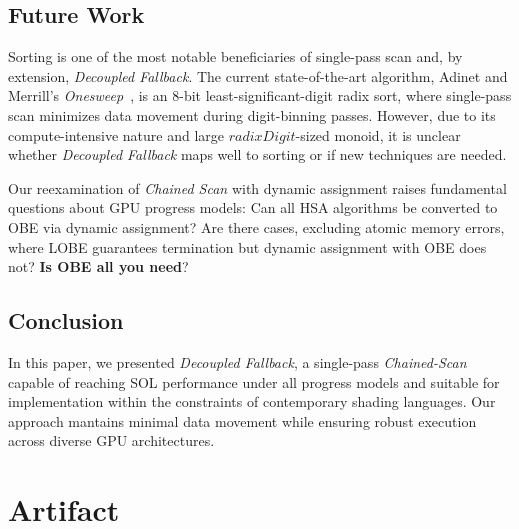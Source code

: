 \documentclass[sigconf]{acmart}
\begin{document}
\subsection{Future Work}
Sorting is one of the most notable beneficiaries of single-pass scan and, by extension, \emph{Decoupled Fallback}. The current state-of-the-art algorithm, Adinet and Merrill’s \emph{Onesweep}~\cite{adinets2022onesweepfastersignificantdigit}, is an 8-bit least-significant-digit radix sort, where single-pass scan minimizes data movement during digit-binning passes. However, due to its compute-intensive nature and large $radixDigit$-sized monoid, it is unclear whether \emph{Decoupled Fallback} maps well to sorting or if new techniques are needed.

Our reexamination of \emph{Chained Scan} with dynamic assignment raises fundamental questions about GPU progress models: Can all HSA algorithms be converted to OBE via dynamic assignment? Are there cases, excluding atomic memory errors, where LOBE guarantees termination but dynamic assignment with OBE does not? \textbf{Is OBE all you need}?

\subsection{Conclusion}
In this paper, we presented \emph{Decoupled Fallback}, a single-pass \emph{Chained-Scan} capable of reaching SOL performance under all progress models and suitable for implementation within the constraints of contemporary shading languages. Our approach mantains minimal data movement while ensuring robust execution across diverse GPU architectures.

\begin{acks}
\end{acks}

\clearpage
\appendix
\section{Artifact}
\end{document}
